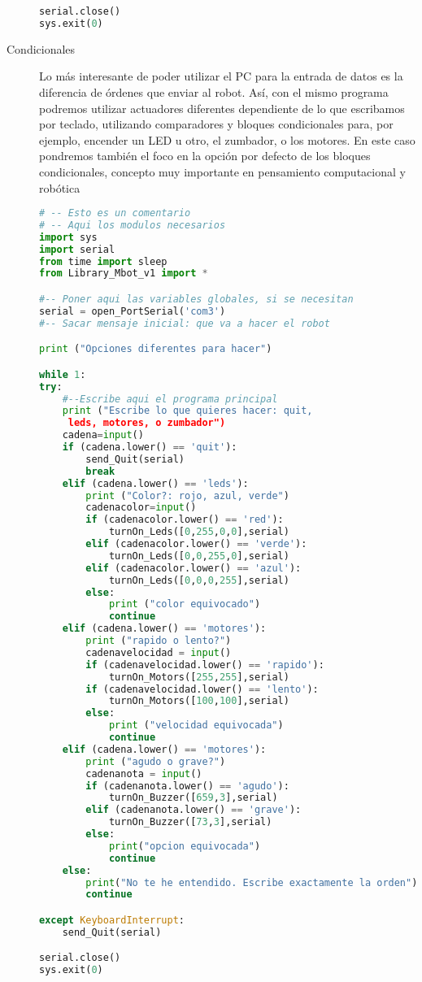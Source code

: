 \begin{description}
\begin{lstlisting}[language=python,caption={Solución del ejercicio de LEDs y sensor de Distancia en Python}]
serial.close()
sys.exit(0)
\end{lstlisting}
	\item [Condicionales] Lo más interesante de poder utilizar el PC para la entrada de datos es la diferencia de órdenes que enviar al robot. Así, con el mismo programa podremos utilizar actuadores diferentes dependiente de lo que escribamos por teclado, utilizando comparadores y bloques condicionales para, por ejemplo, encender un LED u otro, el zumbador, o los motores. En este caso pondremos también el foco en la opción por defecto de los bloques condicionales, concepto muy importante en pensamiento computacional y robótica
\begin{lstlisting}[language=python,caption={Solución de referencia del ejercicio sobre condicionales}]
# -- Esto es un comentario		
# -- Aqui los modulos necesarios
import sys
import serial
from time import sleep
from Library_Mbot_v1 import *

#-- Poner aqui las variables globales, si se necesitan
serial = open_PortSerial('com3')
#-- Sacar mensaje inicial: que va a hacer el robot

print ("Opciones diferentes para hacer")

while 1:
try:
	#--Escribe aqui el programa principal
	print ("Escribe lo que quieres hacer: quit,
	 leds, motores, o zumbador")
	cadena=input()
	if (cadena.lower() == 'quit'):
		send_Quit(serial)
		break
	elif (cadena.lower() == 'leds'):
		print ("Color?: rojo, azul, verde")
		cadenacolor=input()
		if (cadenacolor.lower() == 'red'):
			turnOn_Leds([0,255,0,0],serial)
		elif (cadenacolor.lower() == 'verde'):
			turnOn_Leds([0,0,255,0],serial)
		elif (cadenacolor.lower() == 'azul'):
			turnOn_Leds([0,0,0,255],serial)
		else:
			print ("color equivocado")
			continue
	elif (cadena.lower() == 'motores'):
		print ("rapido o lento?")
		cadenavelocidad = input()
		if (cadenavelocidad.lower() == 'rapido'):
			turnOn_Motors([255,255],serial)
		if (cadenavelocidad.lower() == 'lento'):
			turnOn_Motors([100,100],serial)
		else:
			print ("velocidad equivocada")
			continue
	elif (cadena.lower() == 'motores'):
		print ("agudo o grave?")
		cadenanota = input()
		if (cadenanota.lower() == 'agudo'):
			turnOn_Buzzer([659,3],serial)
		elif (cadenanota.lower() == 'grave'):
			turnOn_Buzzer([73,3],serial)
		else:
			print("opcion equivocada")
			continue
	else:
		print("No te he entendido. Escribe exactamente la orden")
		continue

except KeyboardInterrupt:
	send_Quit(serial)

serial.close()
sys.exit(0)
\end{lstlisting}
\end{description}